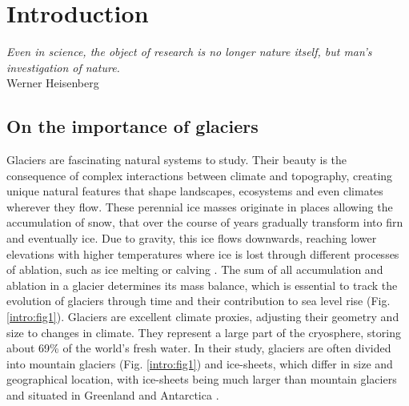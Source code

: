 \chapter{Introduction}
\label{chap:intro}

\begin{flushright}
\begin{small}
\textit{Even in science, the object of research is no longer nature itself, but man's investigation of nature.}\\
Werner Heisenberg
\end{small}
\end{flushright}

\section{On the importance of glaciers}

Glaciers are fascinating natural systems to study. Their beauty is the consequence of complex interactions between climate and topography, creating  unique natural features that shape landscapes, ecosystems and even climates wherever they flow. These perennial ice masses originate in places allowing the accumulation of snow, that over the course of years gradually transform into firn and eventually ice. Due to gravity, this ice flows downwards, reaching lower elevations with higher temperatures where ice is lost through different processes of ablation, such as ice melting or calving \citep{ipcc_climate_2018}. The sum of all accumulation and ablation in a glacier determines its mass balance, which is essential to track the evolution of glaciers through time and their contribution to sea level rise (Fig. \ref{intro:fig1}). Glaciers are excellent climate proxies, adjusting their geometry and size to changes in climate. They represent a large part of the cryosphere, storing about 69\% of the world's fresh water. In their study, glaciers are often divided into mountain glaciers (Fig. \ref{intro:fig1}) and ice-sheets, which differ in size and geographical location, with ice-sheets being much larger than mountain glaciers and situated in Greenland and Antarctica \citep{benn_glaciers_2014}. 


